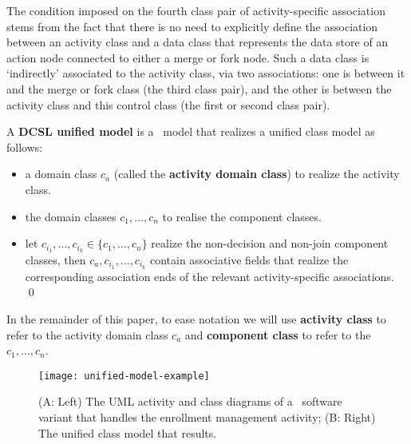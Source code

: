 The condition imposed on the fourth class pair of activity-specific association stems from the fact that there is no need to explicitly define the association between an activity class and a data class that represents the data store of an action node connected to either a merge or fork node. Such a data class is `indirectly' associated to the activity class, via two associations: one is between it and the merge or fork class (the third class pair), and the other is between the activity class and this control class (the first or second class pair).

\begin{definition} \label{def:unified-model}
	A \textbf{DCSL unified model} is a \dcsl~model that realizes a unified class model as follows:
	\begin{itemize}%
		\item a domain class $ c_a $ (called the \textbf{activity domain class}) to realize the activity class.
		\item the domain classes $ c_1,\dots,c_n $ to realise the component classes.
		\item let $ c_{i_1},\dots,c_{i_k} \in \{c_1,\dots,c_n\} $ realize the non-decision and non-join component classes, then $ c_a,c_{i_1},\dots,c_{i_k} $ contain associative fields that realize the corresponding association ends of the relevant activity-specific associations. \qed
	\end{itemize}
\end{definition}

In the remainder of this paper, to ease notation we will use \textbf{activity class} to refer to the activity domain class $ c_a $ and \textbf{component class} to refer to the $ c_1,\dots,c_n $. 

\begin{figure*}[ht]
	\begin{center}
		\texttt{[image: unified-model-example]}
	\end{center}
	\caption{(A: Left) The UML activity and class diagrams of a \courseman~software variant that handles the enrollment management activity; (B: Right) The unified class model that results.} %
	\label{fig:unified-model-example}
\end{figure*} 


